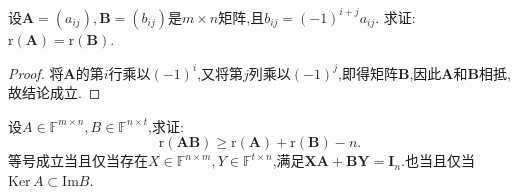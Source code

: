 \documentclass[../../main.tex]{subfiles}%
\begin{document}
\begin{example}
设\(\boldsymbol{A}=(a_{ij}),\boldsymbol{B}=(b_{ij})\)是\(m\times n\)矩阵,且\(b_{ij}=(-1)^{i + j}a_{ij}\). 求证:\(\mathrm{r}(\boldsymbol{A})=\mathrm{r}(\boldsymbol{B})\).
\end{example}
\begin{proof}
将\(\boldsymbol{A}\)的第\(i\)行乘以\((-1)^i\),又将第\(j\)列乘以\((-1)^j\),即得矩阵\(\boldsymbol{B}\),因此\(\boldsymbol{A}\)和\(\boldsymbol{B}\)相抵,故结论成立. 
\end{proof}

\begin{proposition}\label{proposition:Sylvester(西尔维斯特)不等式}
设$A\in \mathbb{F} ^{m\times n},B\in \mathbb{F} ^{n\times t}$,求证:
\[
\mathrm{r}(\boldsymbol{A}\boldsymbol{B})\geqslant \mathrm{r}(\boldsymbol{A})+\mathrm{r}(\boldsymbol{B}) - n.
\]
等号成立当且仅当存在$X\in \mathbb{F} ^{n\times m},Y\in \mathbb{F} ^{t\times n}$,满足$\boldsymbol{X}\boldsymbol{A}+\boldsymbol{B}\boldsymbol{Y}=\boldsymbol{I}_n$.也当且仅当$\text{Ker}\,A\subset \text{Im}B$.
\end{proposition}
\end{document}
